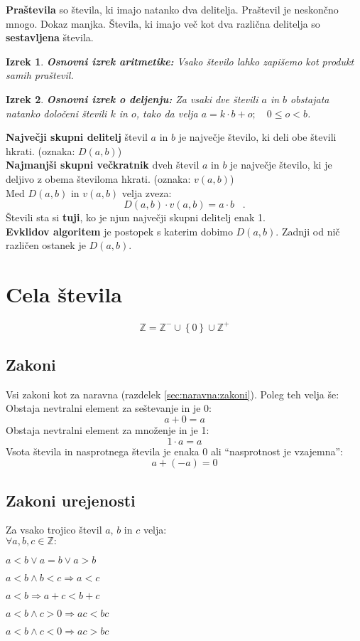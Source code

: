 \documentclass[a4paper,oneside,12pt,fleqn]{article}
\newtheorem{izrek}{Izrek} %
\def\Z{\ensuremath{\mathbb Z}}
\newcommand{\edot}{\;\;\;.}
\newcommand\krat\cdot
\renewcommand\implies\Rightarrow
\numberwithin{equation}{section}
\newenvironment{enumerate*}%
{
\vspace{-12pt}%
\begin{enumerate}%
\setlength{\itemsep}{0pt}%
\setlength{\parskip}{2pt}}%
{\end{enumerate}}
\begin{document}
\textbf{Praštevila} so števila, ki imajo natanko dva delitelja. Praštevil je neskončno mnogo.
Dokaz manjka. Števila, ki imajo več kot dva različna delitelja so \textbf{sestavljena} števila. 
\begin{izrek}
  \textnormal{\textbf{Osnovni izrek aritmetike:} Vsako število lahko zapišemo kot produkt
  samih praštevil.}
\end{izrek}

\begin{izrek}
  \textnormal{\textbf{Osnovni izrek o deljenju:} Za vsaki dve števili $a$ in $b$ obstajata
  natanko določeni števili $k$ in $o$, tako da velja $a = k \krat b+ o; \quad 0 \leq o < b$.}
\end{izrek}

\textbf{Največji skupni delitelj} števil $a$ in $b$ je največje število, ki deli obe števili
hkrati. (oznaka: $D(a,b)$) \\
\textbf{Najmanjši skupni večkratnik} dveh števil $a$ in $b$ je največje število, ki je deljivo z obema
številoma hkrati. (oznaka: $v(a,b)$) \\
Med $D(a,b)$ in $v(a,b)$ velja zveza: 
\[ D(a,b) \krat v(a,b) = a \krat b \edot \]
Števili sta si \textbf{tuji}, ko je njun največji skupni delitelj enak 1. \\
\textbf{Evklidov algoritem} je postopek s katerim dobimo $D(a,b)$. Zadnji od nič različen
ostanek je $D(a,b)$.

\section{Cela števila}
\label{sec:cela}
\[ \Z = \Z^- \cup \left\{ 0 \right\} \cup \Z^+ \]

\subsection{Zakoni}
\label{sec:cela:zakoni}
Vsi zakoni kot za naravna (razdelek \ref{sec:naravna:zakoni}). Poleg teh velja še: \\
Obstaja nevtralni element za seštevanje in je 0:
\[ a + 0 = a \]
Obstaja nevtralni element za množenje in je 1: 
\[ 1 \krat a = a \]
Vsota števila in nasprotnega števila je enaka 0 ali ``nasprotnost je vzajemna'': 
\[ a + (-a) = 0 \]

\subsection{Zakoni urejenosti}
\label{sec:cela:zakoniurejenosti}
Za vsako trojico števil $a$, $b$ in $c$ velja: \\
$\forall a, b, c \in \Z \!:$ 
\begin{enumerate*}
  \item $a < b \lor a = b \lor a > b$
  \item $a < b \land b < c \implies a < c$
  \item $a < b \implies a + c < b + c$
  \item $a < b \land c > 0 \implies ac < bc$
  \item $a < b \land c < 0 \implies ac > bc$
\end{enumerate*}
\end{document}
